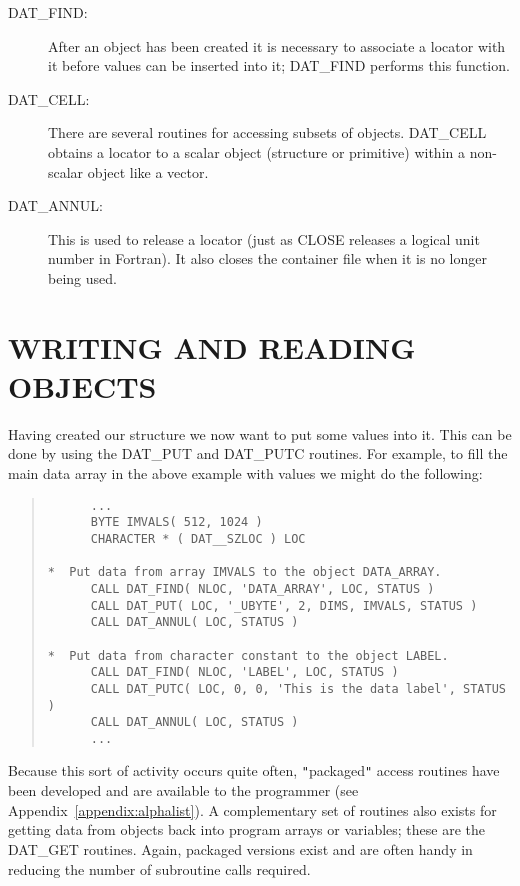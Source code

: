 \documentclass[11pt]{article}
\newcommand{\htmlref}[2]{#1}
\newcommand{\xlabel}[1]{}
\newcommand{\qt}[1]{``#1''}
\renewcommand{\qt}[1]{{\tt{"}}#1{\tt{"}}}
\begin{document}
\begin{description}
\item [\htmlref{DAT\_FIND}{DAT_FIND}:]
After an object has been created it is necessary to associate a
locator with it before values can be inserted into it; DAT\_FIND
performs this function.

\item [\htmlref{DAT\_CELL}{DAT_CELL}:]
There are several routines for accessing subsets of objects. DAT\_CELL
obtains a locator to a scalar object (structure or primitive) within a
non-scalar object like a vector.

\item [\htmlref{DAT\_ANNUL}{DAT_ANNUL}:]
This is used to release a locator (just as CLOSE releases a logical
unit number in Fortran). It also closes the container file when it is
no longer being used.

\end{description}

\section{\xlabel{writing_and_reading}WRITING AND READING OBJECTS}

Having created our structure we now want to put some values into
it. This can be done by using the \htmlref{DAT\_PUT}{DAT_PUT} and
\htmlref{DAT\_PUTC}{DAT_PUTC} routines. For example, to fill the main
data array in the \htmlref{above example}{sect:creating} with
values we might do the following:

\small
\begin{quote}
\begin{verbatim}
      ...
      BYTE IMVALS( 512, 1024 )
      CHARACTER * ( DAT__SZLOC ) LOC

*  Put data from array IMVALS to the object DATA_ARRAY.
      CALL DAT_FIND( NLOC, 'DATA_ARRAY', LOC, STATUS )
      CALL DAT_PUT( LOC, '_UBYTE', 2, DIMS, IMVALS, STATUS )
      CALL DAT_ANNUL( LOC, STATUS )

*  Put data from character constant to the object LABEL.
      CALL DAT_FIND( NLOC, 'LABEL', LOC, STATUS )
      CALL DAT_PUTC( LOC, 0, 0, 'This is the data label', STATUS )
      CALL DAT_ANNUL( LOC, STATUS )
      ...
\end{verbatim}
\end{quote}
\normalsize

Because this sort of activity occurs quite often, \qt{packaged} access
routines have been developed and are available to the programmer (see
Appendix~\ref{appendix:alphalist}).  A complementary set of routines
also exists for getting data from objects back into program arrays or
variables; these are the DAT\_GET routines. Again, packaged versions
exist and are often handy in reducing the number of subroutine calls
required.
\end{document}
